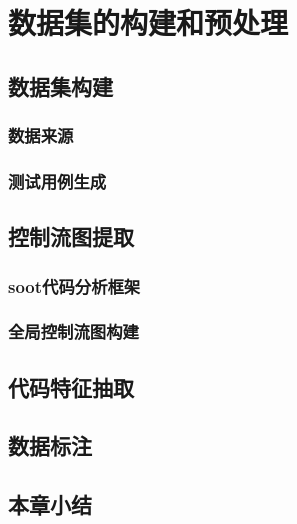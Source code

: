 \chapter{数据集的构建和预处理}

\section{数据集构建}
\subsection{数据来源}
\subsection{测试用例生成}
\section{控制流图提取}
\subsection{soot代码分析框架}
\subsection{全局控制流图构建}
\section{代码特征抽取}
\section{数据标注}
\section{本章小结}